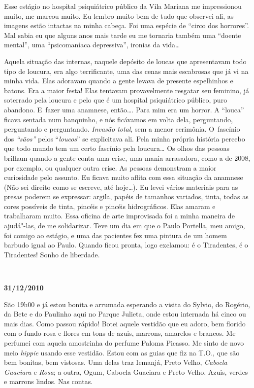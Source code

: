 Esse estágio no hospital psiquiátrico público da Vila Mariana me
impressionou muito, me marcou muito. Eu lembro muito bem de tudo que
observei ali, as imagens estão intactas na minha cabeça. Foi uma espécie
de ``circo dos horrores''. Mal sabia eu que alguns anos mais tarde eu me
tornaria também uma ``doente mental'', uma ``psicomaníaca depressiva'',
ironias da vida…

Aquela situação das internas, naquele depósito de loucas que
apresentavam todo tipo de loucura, era algo terrificante, uma das cenas
mais escabrosas que já vi na minha vida. Elas adoravam quando a gente
levava de presente espelhinhos e batons. Era a maior festa! Elas
tentavam provavelmente resgatar seu feminino, já soterrado pela loucura
e pelo que é um hospital psiquiátrico público, puro abandono. E~fazer
uma anamnese, então…. Para mim era um horror. A ``louca'' ficava
sentada num banquinho, e nós ficávamos em volta dela, perguntando,
perguntando e perguntando. \emph{Invasão total}, sem a menor cerimônia.
O~fascínio dos \emph{``sãos''} pelos ``\emph{loucos}'' se explicitava
ali. Pela minha própria história percebo que todo mundo tem um certo
fascínio pela loucura… Os olhos das pessoas brilham quando a
gente conta uma crise, uma mania arrasadora, como a de 2008, por
exemplo, ou qualquer outra crise. As pessoas demonstram a maior
curiosidade pelo assunto. Eu ficava muito aflita com essa situação da
anamnese (Não sei direito como se escreve, até hoje…). Eu levei
vários materiais para as presas poderem se expressar: argila, papéis de
tamanhos variados, tinta, todas as cores possíveis de tinta, pincéis e
pincéis hidrográficos. Elas amaram e trabalharam muito. Essa oficina de
arte improvisada foi a minha maneira de ajudá"-las, de me solidarizar.
Teve um dia em que o Paulo Portella, meu amigo, foi comigo ao estágio, e
uma das pacientes fez uma pintura de um homem barbudo igual ao Paulo.
Quando ficou pronta, logo exclamou: é o Tiradentes, é o Tiradentes!
Sonho de liberdade.

\begin{center}\asterisc{}​\end{center}


\begin{flushright}\textbf{31/12/2010}\end{flushright}


São 19h00 e já estou bonita e arrumada esperando a visita do Sylvio, do
Rogério, da Bete e do Paulinho aqui no Parque Julieta, onde estou
internada há cinco ou mais dias. Como passou rápido! Botei aquele
vestidão que eu adoro, bem florido com o fundo rosa e flores em tons de
azuis, marrons, amarelos e brancos. Me perfumei com aquela amostrinha do
perfume Paloma Picasso. Me sinto de novo meio \emph{hippie} usando esse
vestidão. Estou com as guias que fiz na T.O., que são bem bonitas, bem
vistosas. Uma delas traz Iemanjá, Preto Velho, \emph{Cabocla Guaciara} e
\emph{Rosa}; a outra, Ogum, Cabocla Guaciara e Preto Velho. Azuis,
verdes e marrons lindos. Nas contas.

